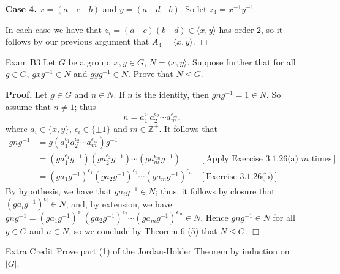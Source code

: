 \documentclass[9pt]{article}
\newcommand{\qed}{\hfill \ensuremath{\Box}}
\newcommand{\cyc}[1]{\langle #1 \rangle}
\newcommand{\Z}{\mathbb{Z}}
\begin{document}
\begin{enumerate}
      \textbf{Case 4.} $x = (a \quad c \quad b)$ and $y = (a \quad d \quad b)$.      
      So let $z_4 = x^{-1}y^{-1}$.
      
      In each case we have that $z_i =  (a \quad c)(b \quad d) \in \cyc{x, y}$
      has order 2, so it follows by our previous argument that
      $A_4 = \cyc{x, y}$. \qed
   \item[Exam B3] Let $G$ be a group, $x, y \in G$, $N = \cyc{x, y}$. Suppose
                  further that for all $g \in G$, $gxg^{-1} \in N$ and
                  $gyg^{-1} \in N$. Prove that $N \trianglelefteq G$.
                  
      \textbf{Proof.} Let $g \in G$ and $n \in N$. If $n$ is the identity, then
      $gng^{-1} = 1 \in N$. So assume that $n \neq 1$; thus
      $$n = a_1^{\epsilon_1}a_2^{\epsilon_2}\cdots a_m^{\epsilon_m},$$
      where $a_i \in \{x, y\}$, $\epsilon_i \in \{\pm1\}$ and $m \in \Z^+$. It
      follows that
      \begin{align*}
         gng^{-1} &= g(a_1^{\epsilon_1}a_2^{\epsilon_2}\cdots
            a_m^{\epsilon_m})g^{-1} \\
            &= (ga_1^{\epsilon_1}g^{-1})(ga_2^{\epsilon_2}g^{-1})\cdots
            (ga_m^{\epsilon_m}g^{-1}) &[\text{Apply Exercise 3.1.26(a) } m
               \text{ times}] \\
            &= (ga_1g^{-1})^{\epsilon_1}(ga_2g^{-1})^{\epsilon_2}\cdots
            (ga_mg^{-1})^{\epsilon_m} &[\text{Exercise 3.1.26(b)}]
      \end{align*}
      By hypothesis, we have that $ga_ig^{-1} \in N$; thus, it follows by
      closure that $(ga_ig^{-1})^{\epsilon_i} \in N$, and, by extension, we have
      $gng^{-1} = (ga_1g^{-1})^{\epsilon_1}(ga_2g^{-1})^{\epsilon_2}\cdots
            (ga_mg^{-1})^{\epsilon_m} \in N$. Hence $gng^{-1} \in N$ for all
      $g \in G$ and $n \in N$, so we conclude by Theorem 6 (5) that
      $N \trianglelefteq G$. \qed
   \item[Extra Credit]  Prove part (1) of the Jordan-H$\ddot{\text{o}}$lder Theorem by induction
                        on $|G|$.
\end{enumerate}
\end{document}
